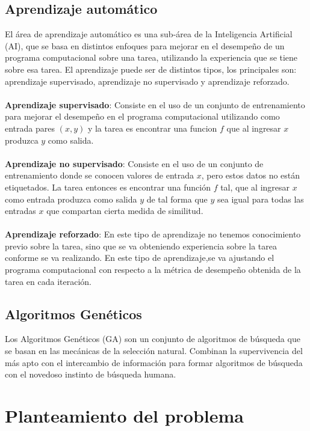 \subsection{Aprendizaje automático}

El área de aprendizaje automático es una sub-área de la Inteligencia Artificial (AI), que se basa en distintos enfoques para mejorar en el desempeño de un programa computacional sobre una tarea, utilizando la experiencia que se tiene sobre esa tarea. El aprendizaje puede ser de distintos tipos, los principales son: aprendizaje supervisado, aprendizaje no supervisado y aprendizaje reforzado.
\\
\\
\textbf{Aprendizaje supervisado}: Consiste en el uso de un conjunto de entrenamiento para mejorar el desempeño en el programa computacional utilizando como entrada pares $(x,y)$ y la tarea es encontrar una funcion $f$ que al ingresar $x$ produzca $y$ como salida. 
\\
\\
\textbf{Aprendizaje no supervisado}: Consiste en el uso de un conjunto de entrenamiento donde se conocen valores de entrada $x$, pero estos datos no están etiquetados. La tarea entonces es encontrar una función $f$ tal, que al ingresar $x$ como entrada produzca como salida $y$ de tal forma que $y$ sea igual para todas las entradas $x$ que compartan cierta medida de similitud.
\\
\\
\textbf{Aprendizaje reforzado}: En este tipo de aprendizaje no tenemos conocimiento previo sobre la tarea, sino que se va obteniendo experiencia sobre la tarea conforme se va realizando. En este tipo de aprendizaje,se va ajustando el programa computacional con respecto a la métrica de desempeño obtenida de la tarea en cada iteración.

\subsection{Algoritmos Genéticos}

Los Algoritmos Genéticos (GA) son un conjunto de algoritmos de búsqueda que se basan en las mecánicas de la selección natural. Combinan la supervivencia del más apto con el intercambio de información para formar algoritmos de búsqueda con el novedoso instinto de búsqueda humana.  

\section{Planteamiento del problema}

